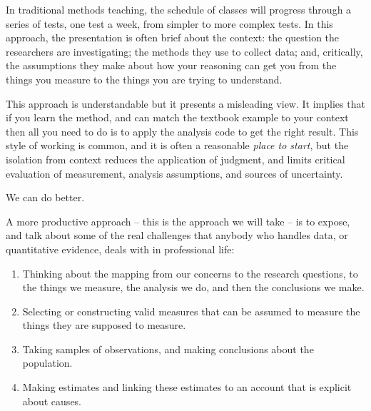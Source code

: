 \documentclass[
  letterpaper,
  DIV=11,
  numbers=noendperiod]{scrreprt}
\providecommand{\tightlist}{%
  \setlength{\itemsep}{0pt}\setlength{\parskip}{0pt}}\usepackage{longtable,booktabs,array}
\begin{document}
In traditional methods teaching, the schedule of classes will progress
through a series of tests, one test a week, from simpler to more complex
tests. In this approach, the presentation is often brief about the
context: the question the researchers are investigating; the methods
they use to collect data; and, critically, the assumptions they make
about how your reasoning can get you from the things you measure to the
things you are trying to understand.

This approach is understandable but it presents a misleading view. It
implies that if you learn the method, and can match the textbook example
to your context then all you need to do is to apply the analysis code to
get the right result. This style of working is common, and it is often a
reasonable \emph{place to start}, but the isolation from context reduces
the application of judgment, and limits critical evaluation of
measurement, analysis assumptions, and sources of uncertainty.

\begin{tcolorbox}[enhanced jigsaw, opacitybacktitle=0.6, title=\textcolor{quarto-callout-tip-color}{\faLightbulb}\hspace{0.5em}{Tip}, arc=.35mm, colbacktitle=quarto-callout-tip-color!10!white, colframe=quarto-callout-tip-color-frame, leftrule=.75mm, opacityback=0, breakable, titlerule=0mm, left=2mm, bottomrule=.15mm, toprule=.15mm, colback=white, coltitle=black, bottomtitle=1mm, toptitle=1mm, rightrule=.15mm]

We can do better.

\end{tcolorbox}

A more productive approach -- this is the approach we will take -- is to
expose, and talk about some of the real challenges that anybody who
handles data, or quantitative evidence, deals with in professional life:

\begin{enumerate}
\def\labelenumi{\arabic{enumi}.}
\tightlist
\item
  Thinking about the mapping from our concerns to the research
  questions, to the things we measure, the analysis we do, and then the
  conclusions we make.
\item
  Selecting or constructing valid measures that can be assumed to
  measure the things they are supposed to measure.
\item
  Taking samples of observations, and making conclusions about the
  population.
\item
  Making estimates and linking these estimates to an account that is
  explicit about causes.
\end{enumerate}
\end{document}
